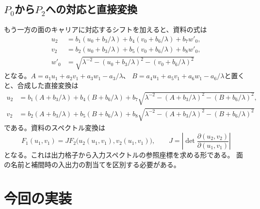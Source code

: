 \documentclass[a4paper,10pt]{ltjsarticle}
\begin{document}
\subsection{$P_0$から$P_2$への対応と直接変換}
もう一方の面のキャリアに対応するシフトを加えると、資料の式は
\begin{align}
 u_2&=b_1(u_0+b_3/\lambda)+b_4(v_0+b_6/\lambda)+b_7w'_0,\\
 v_2&=b_2(u_0+b_3/\lambda)+b_5(v_0+b_6/\lambda)+b_8w'_0,\\
 w'_0&=\sqrt{\lambda^{-2}-(u_0+b_3/\lambda)^2-(v_0+b_6/\lambda)^2}
\end{align}
となる。$A=a_1u_1+a_2v_1+a_3w_1-a_3/\lambda$、
$B=a_4u_1+a_5v_1+a_6w_1-a_6/\lambda$と置くと、合成した直接変換は
\begin{align}
 u_2&=b_1(A+b_3/\lambda)+b_4(B+b_6/\lambda)
       +b_7\sqrt{\lambda^{-2}-(A+b_3/\lambda)^2-(B+b_6/\lambda)^2},\\
 v_2&=b_2(A+b_3/\lambda)+b_5(B+b_6/\lambda)
       +b_8\sqrt{\lambda^{-2}-(A+b_3/\lambda)^2-(B+b_6/\lambda)^2}
\end{align}
である。資料のスペクトル変換は
\begin{equation}
 F_1(u_1,v_1)=J F_2\bigl(u_2(u_1,v_1),v_2(u_1,v_1)\bigr),\qquad
 J=\left|\det\frac{\partial(u_2,v_2)}{\partial(u_1,v_1)}\right|
\end{equation}
となる。これは出力格子から入力スペクトルの参照座標を求める形である。
面の名前と補間時の入出力の割当てを区別する必要がある。

\clearpage
\section{今回の実装}
\end{document}

